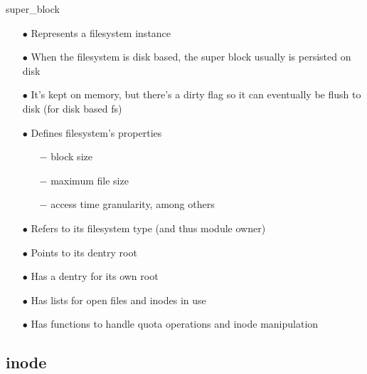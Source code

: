 \documentclass{beamer}
\begin{document}
\begin{frame}{super\_block}
	
	\begin{itemize}[<+->]

		\item[$\bullet$]{Represents a filesystem instance}
		\item[$\bullet$]{When the filesystem is disk based, the super block usually is persisted on disk}		
		\item[$\bullet$]{It's kept on memory, but there's a dirty flag so it can eventually be flush to disk (for disk based fs)}
		\item[$\bullet$]{Defines filesystem's properties}
			\begin{itemize}
				\item[$-$]{block size}
				\item[$-$]{maximum file size}
				\item[$-$]{access time granularity, among others}
			\end{itemize}	
		
		\item[$\bullet$]{Refers to its filesystem type (and thus module owner)}
		\item[$\bullet$]{Points to its dentry root}
		\item[$\bullet$]{Has a dentry for its own root}
		\item[$\bullet$]{Has lists for open files and inodes in use}
		\item[$\bullet$]{Has functions to handle quota operations and inode manipulation}
		
	\end{itemize}

\end{frame}

\subsection{inode}
\end{document}
